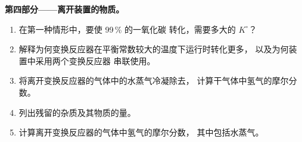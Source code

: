 \begin{problem}
\medskip
\noindent\textbf{第四部分——离开装置的物质。}
\begin{enumerate}[resume]
  \item 在第一种情形中，要使 99\,\% 的一氧化碳
        转化，需要多大的 $K^\circ$？
  \item 解释为何变换反应器在平衡常数较大的温度下运行时转化更多，
        以及为何装置中采用两个变换反应器
        串联使用。
  \item 将离开变换反应器的气体中的水蒸气冷凝除去，
        计算干气体中氢气的摩尔分数。
  \item 列出残留的杂质及其物质的量。
  \item 计算离开变换反应器的气体中氢气的摩尔分数，
        其中包括水蒸气。
\end{enumerate}
\end{problem}
